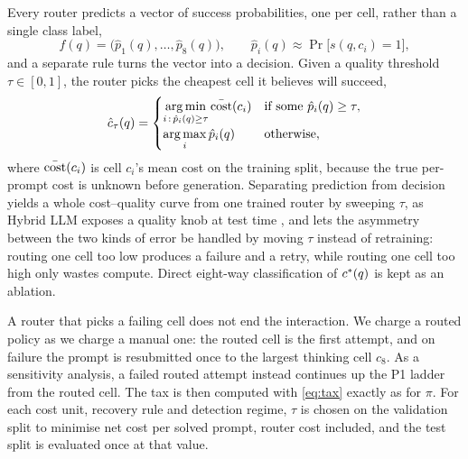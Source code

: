 Every router predicts a vector of success probabilities, one per cell, rather
than a single class label,
\begin{equation}
  f(q) = \bigl(\hat{p}_1(q), \dots, \hat{p}_8(q)\bigr), \qquad
  \hat{p}_i(q) \approx \Pr\bigl[s(q, c_i) = 1\bigr],
  \label{eq:router}
\end{equation}
and a separate rule turns the vector into a decision. Given a quality
threshold $\tau \in [0, 1]$, the router picks the cheapest cell it believes
will succeed,
\begin{equation}
  \hat{c}_\tau(q) =
  \begin{cases}
    \displaystyle\operatorname*{arg\,min}_{i \,:\, \hat{p}_i(q) \geq \tau} \bar{\mathrm{cost}}(c_i)
      & \text{if some } \hat{p}_i(q) \geq \tau,\\[1.2ex]
    \displaystyle\operatorname*{arg\,max}_{i} \hat{p}_i(q) & \text{otherwise},
  \end{cases}
  \label{eq:selection}
\end{equation}
where $\bar{\mathrm{cost}}(c_i)$ is cell $c_i$'s mean cost on the training split,
because the true per-prompt cost is unknown before generation. Separating
prediction from decision yields a whole cost--quality curve from one trained
router by sweeping $\tau$, as Hybrid LLM exposes a quality knob at test time
\cite{ding2024hybridllm}, and lets the asymmetry between the two kinds of
error be handled by moving $\tau$ instead of retraining: routing one cell too
low produces a failure and a retry, while routing one cell too high only
wastes compute. Direct eight-way classification of $c^{*}(q)$ is kept as an
ablation.

A router that picks a failing cell does not end the interaction. We charge a
routed policy as we charge a manual one: the routed cell is the first
attempt, and on failure the prompt is resubmitted once to the largest
thinking cell $c_8$. As a sensitivity analysis, a failed routed attempt
instead continues up the P1 ladder from the routed cell. The tax is then
computed with \eqref{eq:tax} exactly as for $\pi$. For each cost unit,
recovery rule and detection regime, $\tau$ is chosen on the validation split
to minimise net cost per solved prompt, router cost included, and the test
split is evaluated once at that value.


